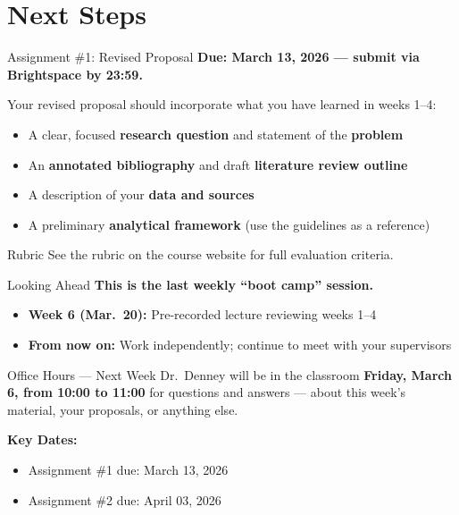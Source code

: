 \documentclass[aspectratio=169,11pt]{beamer}
\begin{document}
\section{Next Steps}

\begin{frame}{Assignment \#1: Revised Proposal}
    \textbf{Due: March 13, 2026 --- submit via Brightspace by 23:59.}
    \vspace{0.3cm}

    Your revised proposal should incorporate what you have learned in weeks 1--4:
    \vspace{0.3cm}
    \begin{itemize}
        \item A clear, focused \textbf{research question} and statement of the \textbf{problem}
        \item An \textbf{annotated bibliography} and draft \textbf{literature review outline}
        \item A description of your \textbf{data and sources}
        \item A preliminary \textbf{analytical framework} (use the guidelines as a reference)
    \end{itemize}
    \vspace{0.3cm}
    \begin{block}{Rubric}
        See the rubric on the course website for full evaluation criteria.
    \end{block}
\end{frame}

\begin{frame}{Looking Ahead}
    \textbf{This is the last weekly ``boot camp'' session.}
    \vspace{0.3cm}

    \begin{itemize}
        \item \textbf{Week 6 (Mar.\ 20):} Pre-recorded lecture reviewing weeks 1--4
        \item \textbf{From now on:} Work independently; continue to meet with your supervisors
    \end{itemize}
    \vspace{0.3cm}
    \begin{block}{Office Hours --- Next Week}
        Dr.\ Denney will be in the classroom \textbf{Friday, March 6, from 10:00 to 11:00} for questions and answers --- about this week's material, your proposals, or anything else.
    \end{block}
    \vspace{0.3cm}
    \textbf{Key Dates:}
    \begin{itemize}
        \item Assignment \#1 due: March 13, 2026
        \item Assignment \#2 due: April 03, 2026
    \end{itemize}
\end{frame}
\end{document}
